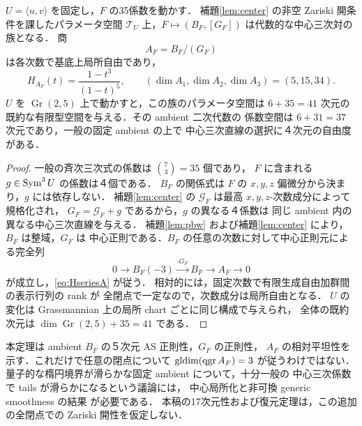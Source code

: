 \begin{theorem}[41次元の中心三次対の代数的族]\label{thm:incidence}
$U=\langle u,v\rangle$ を固定し，$F$ の35係数を動かす．
補題\ref{lem:center} の非空 Zariski 開条件を課したパラメータ空間
$\mathcal T_U$ 上，$F\mapsto(B_F,[G_F])$ は代数的な中心三次対の族となる．
商
\begin{equation}\label{eq:A}
 A_F=B_F/(G_F)
\end{equation}
は各次数で基底上局所自由であり，
\begin{equation}\label{eq:HseriesA}
 H_{A_F}(t)=\frac{1-t^3}{(1-t)^5},\qquad
 (\dim A_1,\dim A_2,\dim A_3)=(5,15,34).
\end{equation}
$U$ を $\operatorname{Gr}(2,5)$ 上で動かすと，この族のパラメータ空間は
$6+35=41$ 次元の既約な有限型空間を与える．その ambient 二次代数の
係数空間は $6+31=37$ 次元であり，一般の固定 ambient の上で
中心三次直線の選択に４次元の自由度がある．
\end{theorem}
\begin{proof}
一般の斉次三次式の係数は $\binom{7}{3}=35$ 個であり，
$F$ に含まれる $g\in\operatorname{Sym}^3U$ の係数は４個である．
$B_F$ の関係式は $F$ の $x,y,z$ 偏微分から決まり，$g$ には依存しない．
補題\ref{lem:center} の $\mathcal G_F$ は最高 $x,y,z$-次数成分によって規格化され，
$G_F=\mathcal G_F+g$ であるから，$g$ の異なる４係数は
同じ ambient 内の異なる中心三次直線を与える．
補題\ref{lem:pbw} および補題\ref{lem:center} により，$B_F$ は整域，$G_F$ は
中心正則である．$B_F$ の任意の次数に対して中心正則元による完全列
\[
 0\longrightarrow B_F(-3)\xrightarrow{\cdot G_F}
 B_F\longrightarrow A_F\longrightarrow0
\]
が成立し，\eqref{eq:HseriesA} が従う．
相対的には，固定次数で有限生成自由加群間の表示行列の rank が
全閉点で一定なので，次数成分は局所自由となる．
$U$ の変化は Grassmannian 上の局所 chart ごとに同じ構成で与えられ，
全体の既約次元は $\dim\operatorname{Gr}(2,5)+35=41$ である．
\end{proof}

\begin{remark}[正則性の二つの意味]\label{rem:regularity}
本定理は ambient $B_F$ の５次元 AS 正則性，$G_F$ の正則性，
$A_F$ の相対平坦性を示す．これだけで任意の閉点について
$\operatorname{gldim}(\operatorname{qgr} A_F)=3$ が従うわけではない．
量子的な楕円境界が滑らかな固定 ambient について，十分一般の
中心三次係数で tails が滑らかになるという議論には，
中心局所化と非可換 generic smoothness の結果
\cite{RSVdB,Rains} が必要である．
本稿の17次元性および復元定理は，この追加の全閉点での
Zariski 開性を仮定しない．
\end{remark}

